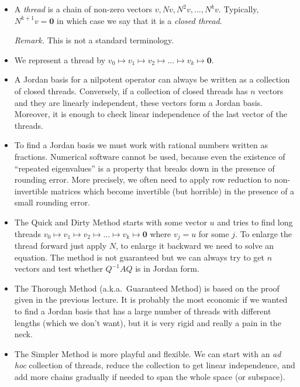 \documentclass[11pt]{article}
\newcommand{\1}{\mathbf{1}}
\newcommand{\0}{\mathbf{0}}
\newcommand{\spitem}{\item[$\circ$]}
\begin{document}
{\begin{itemize}
\item

A \emph{thread} is a chain of non-zero vectors $v,Nv,N^2v,\dots,N^kv$.
Typically, $ N^{k+1}v =\0 $ in which case we say that it is a \emph{closed thread}.

\emph{Remark.}
This is not a standard terminology.

\item

We represent a thread by $v_0 \mapsto v_1 \mapsto v_2 \mapsto \dots \mapsto v_k \mapsto \0$.

\item

A Jordan basis for a nilpotent operator can always be written as a collection of closed threads.
Conversely, if a collection of closed threads has $n$ vectors and they are linearly independent, these vectors form a Jordan basis.
Moreover, it is enough to check linear independence of the last vector of the threads.

\spitem

To find a Jordan basis we must work with rational numbers written as fractions.
Numerical software cannot be used, because even the existence of ``repeated eigenvalues'' is a property that breaks down in the presence of rounding error.
More precisely, we often need to apply row reduction to non-invertible matrices which become invertible (but horrible) in the presence of a small rounding error.

\item

The Quick and Dirty Method starts with some vector $u$ and tries to find long threads $v_0 \mapsto v_1 \mapsto v_2 \mapsto \dots \mapsto v_k \mapsto \0$ where $v_j=u$ for some $j$. To enlarge the thread forward just apply $N$, to enlarge it backward we need to solve an equation. The method is not guaranteed but we can always try to get $n$ vectors and test whether $ Q^{-1} A Q $ is in Jordan form.

\spitem

The Thorough Method (a.k.a.\ Guaranteed Method) is based on the proof given in the previous lecture.
It is probably the most economic if we wanted to find a Jordan basis that has a large number of threads with different lengths (which we don't want), but it is very rigid and really a pain in the neck.

\item

The Simpler Method is more playful and flexible. We can start with an \textsl{ad hoc} collection of threads, reduce the collection to get linear independence, and add more chains gradually if needed to span the whole space (or subspace).


\end{itemize}}
\end{document}
